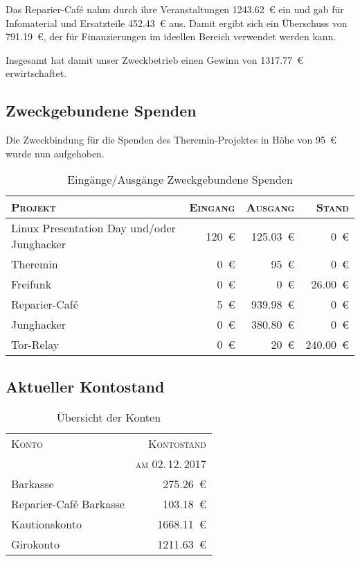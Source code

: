 \documentclass[ngerman]{scrartcl}
\begin{document}
Das Reparier-Café nahm durch ihre Veranstaltungen \num{1243,62}~\euro{} ein und gab für Infomaterial und Ersatzteile \num{452,43}~\euro{} aus.
Damit ergibt sich ein Überschuss von \num{791,19}~\euro{}, der für Finanzierungen im ideellen Bereich verwendet werden kann.

Insgesamt hat damit unser Zweckbetrieb einen Gewinn von \num{1317,77}~\euro{} erwirtschaftet.

\subsection{Zweckgebundene Spenden}
\label{sec:zweckgebundene_spenden}

Die Zweckbindung für die Spenden des Theremin-Projektes in Höhe von \num{95}~\euro{} wurde nun aufgehoben.

\begin{table}[h]
        \centering
        \begin{tabular}{l|r|r|r}
        \toprule
        \textsc{Projekt} & \textsc{Eingang} & \textsc{Ausgang} & \textsc{Stand} \\
        \midrule
        Linux Presentation Day und/oder Junghacker & \num{120}~\euro{} & \num{125,03}~\euro{} & \num{0}~\euro{} \\
        Theremin & \num{0}~\euro{} & \num{95}~\euro{} & \num{0}~\euro{} \\
        Freifunk & \num{0}~\euro{} & \num{0}~\euro{} & \num{26,00}~\euro{} \\
        Reparier-Café & \num{5}~\euro{} & \num{939,98}~\euro{} & \num{0}~\euro{} \\
        Junghacker & \num{0}~\euro{} & \num{380,80}~\euro{} & \num{0}~\euro{} \\
        Tor-Relay & \num{0}~\euro{} & \num{20}~\euro{} & \num{240,00}~\euro{} \\
\bottomrule
        \end{tabular}
        \caption{Eingänge/Ausgänge Zweckgebundene Spenden}
        \label{table:spenden}
\end{table}

\subsection{Aktueller Kontostand}

\begin{table}[h!]
        \centering{}
        \begin{tabular}{l|r}
        \toprule
        \textsc{Konto} & \textsc{Kontostand} \\
        & \textsc{am 02.\,12.\,2017} \\
        \midrule
        Barkasse & \num{275,26}~\euro{} \\
        Reparier-Café Barkasse & \num{103,18}~\euro{} \\
        Kautionskonto & \num{1668,11}~\euro{} \\
        Girokonto & \num{1211,63}~\euro{}\\
        \bottomrule
        \end{tabular}
\caption{Übersicht der Konten}
\end{table}
\end{document}
